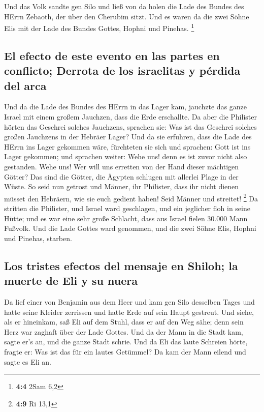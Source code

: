  Und das Volk sandte gen Silo und ließ von da holen die
Lade des Bundes des HErrn Zebaoth, der über den Cherubim sitzt. Und es
waren da die zwei Söhne Elis mit der Lade des Bundes Gottes, Hophni und
Pinehas. \footnote{\textbf{4:4} 2Sam 6,2}

\hypertarget{el-efecto-de-este-evento-en-las-partes-en-conflicto-derrota-de-los-israelitas-y-puxe9rdida-del-arca}{%
\subsection{El efecto de este evento en las partes en conflicto; Derrota
de los israelitas y pérdida del
arca}\label{el-efecto-de-este-evento-en-las-partes-en-conflicto-derrota-de-los-israelitas-y-puxe9rdida-del-arca}}

 Und da die Lade des Bundes des HErrn in das Lager kam,
jauchzte das ganze Israel mit einem großem Jauchzen, dass die Erde
erschallte.  Da aber die Philister hörten das Geschrei
solches Jauchzens, sprachen sie: Was ist das Geschrei solches großen
Jauchzens in der Hebräer Lager? Und da sie erfuhren, dass die Lade des
HErrn ins Lager gekommen wäre,  fürchteten sie sich und
sprachen: Gott ist ins Lager gekommen; und sprachen weiter: Wehe uns!
denn es ist zuvor nicht also gestanden.  Wehe uns! Wer
will uns erretten von der Hand dieser mächtigen Götter? Das sind die
Götter, die Ägypten schlugen mit allerlei Plage in der Wüste.
 So seid nun getrost und Männer, ihr Philister, dass ihr
nicht dienen müsset den Hebräern, wie sie euch gedient haben! Seid
Männer und streitet! \footnote{\textbf{4:9} Ri 13,1}  Da
stritten die Philister, und Israel ward geschlagen, und ein jeglicher
floh in seine Hütte; und es war eine sehr große Schlacht, dass aus
Israel fielen 30.000 Mann Fußvolk.  Und die Lade Gottes
ward genommen, und die zwei Söhne Elis, Hophni und Pinehas, starben.

\hypertarget{los-tristes-efectos-del-mensaje-en-shiloh-la-muerte-de-eli-y-su-nuera}{%
\subsection{Los tristes efectos del mensaje en Shiloh; la muerte de Eli
y su
nuera}\label{los-tristes-efectos-del-mensaje-en-shiloh-la-muerte-de-eli-y-su-nuera}}

 Da lief einer von Benjamin aus dem Heer und kam gen Silo
desselben Tages und hatte seine Kleider zerrissen und hatte Erde auf
sein Haupt gestreut.  Und siehe, als er hineinkam, saß
Eli auf dem Stuhl, dass er auf den Weg sähe; denn sein Herz war zaghaft
über der Lade Gottes. Und da der Mann in die Stadt kam, sagte er's an,
und die ganze Stadt schrie.  Und da Eli das laute
Schreien hörte, fragte er: Was ist das für ein lautes Getümmel? Da kam
der Mann eilend und sagte es Eli an.

